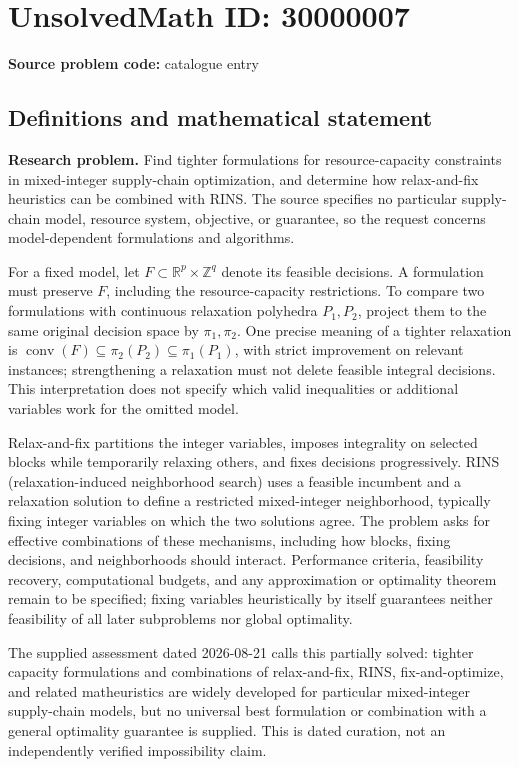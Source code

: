 \documentclass[11pt]{article}
\newcommand{\Z}{\mathbb{Z}}
\newcommand{\R}{\mathbb{R}}
\begin{document}
\section*{UnsolvedMath ID: 30000007}
\textbf{Source problem code:} catalogue entry
\subsection{Definitions and mathematical statement}
\textbf{Research problem.} Find tighter formulations for resource-capacity constraints in mixed-integer supply-chain optimization, and determine how relax-and-fix heuristics can be combined with RINS. The source specifies no particular supply-chain model, resource system, objective, or guarantee, so the request concerns model-dependent formulations and algorithms.\par For a fixed model, let \(F\subset\R^p\times\Z^q\) denote its feasible decisions. A formulation must preserve \(F\), including the resource-capacity restrictions. To compare two formulations with continuous relaxation polyhedra \(P_1,P_2\), project them to the same original decision space by \(\pi_1,\pi_2\). One precise meaning of a tighter relaxation is \(\operatorname{conv}(F)\subseteq\pi_2(P_2)\subseteq\pi_1(P_1)\), with strict improvement on relevant instances; strengthening a relaxation must not delete feasible integral decisions. This interpretation does not specify which valid inequalities or additional variables work for the omitted model.\par Relax-and-fix partitions the integer variables, imposes integrality on selected blocks while temporarily relaxing others, and fixes decisions progressively. RINS (relaxation-induced neighborhood search) uses a feasible incumbent and a relaxation solution to define a restricted mixed-integer neighborhood, typically fixing integer variables on which the two solutions agree. The problem asks for effective combinations of these mechanisms, including how blocks, fixing decisions, and neighborhoods should interact. Performance criteria, feasibility recovery, computational budgets, and any approximation or optimality theorem remain to be specified; fixing variables heuristically by itself guarantees neither feasibility of all later subproblems nor global optimality.\par The supplied assessment dated 2026-08-21 calls this partially solved: tighter capacity formulations and combinations of relax-and-fix, RINS, fix-and-optimize, and related matheuristics are widely developed for particular mixed-integer supply-chain models, but no universal best formulation or combination with a general optimality guarantee is supplied. This is dated curation, not an independently verified impossibility claim.
\end{document}

